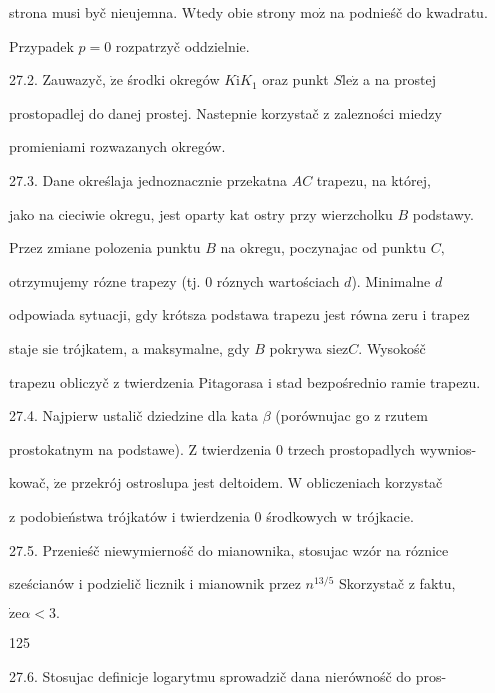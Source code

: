 \documentclass[a4paper,12pt]{article}
\begin{document}
strona musi byč nieujemna. Wtedy obie strony $\mathrm{m}\mathrm{o}\dot{\mathrm{z}}$ na podnieśč do kwadratu.

Przypadek $p=0$ rozpatrzyč oddzielnie.

27.2. Zauwazyč, $\dot{\mathrm{z}}\mathrm{e}$ środki okregów $K\mathrm{i}K_{1}$ oraz punkt $S\mathrm{l}\mathrm{e}\dot{\mathrm{z}}$ a na prostej

prostopadlej do danej prostej. Nastepnie korzystač $\mathrm{z}$ zalezności miedzy

promieniami rozwazanych okregów.

27.3. Dane określaja jednoznacznie przekatna $AC$ trapezu, na której,

jako na cieciwie okregu, jest oparty $\mathrm{k}\mathrm{a}\mathrm{t}$ ostry przy wierzcholku $B$ podstawy.

Przez zmiane polozenia punktu $B$ na okregu, poczynajac od punktu $C,$

otrzymujemy rózne trapezy (tj. $0$ róznych wartościach $d$). Minimalne $d$

odpowiada sytuacji, gdy krótsza podstawa trapezu jest równa zeru $\mathrm{i}$ trapez

staje $\mathrm{s}\mathrm{i}\mathrm{e}$ trójkatem, a maksymalne, gdy $B$ pokrywa $\mathrm{s}\mathrm{i}\mathrm{e} \mathrm{z} C$. Wysokośč

trapezu obliczyč $\mathrm{z}$ twierdzenia Pitagorasa $\mathrm{i}$ stad bezpośrednio ramie trapezu.

27.4. Najpierw ustalič dziedzine dla kata $\beta$ (porównujac go $\mathrm{z}$ rzutem

prostokatnym na podstawe). $\mathrm{Z}$ twierdzenia $0$ trzech prostopadlych wywnios-

kowač, $\dot{\mathrm{z}}\mathrm{e}$ przekrój ostroslupa jest deltoidem. $\mathrm{W}$ obliczeniach korzystač

$\mathrm{z}$ podobieństwa trójkatów $\mathrm{i}$ twierdzenia $0$ środkowych $\mathrm{w}$ trójkacie.

27.5. Przenieśč niewymiernośč do mianownika, stosujac wzór na róznice

sześcianów $\mathrm{i}$ podzielič licznik $\mathrm{i}$ mianownik przez $n^{13/5}$ Skorzystač $\mathrm{z}$ faktu,

$\dot{\mathrm{z}}\mathrm{e}\alpha<3.$





125

27.6. Stosujac definicje logarytmu sprowadzič dana nierównośč do pros-
\end{document}
